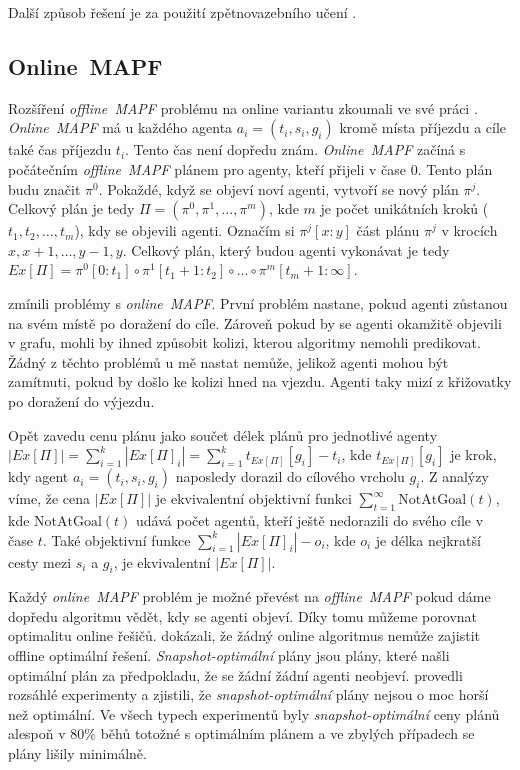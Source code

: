 Další způsob řešení je za použití zpětnovazebního učení \citep*{Zhiyao}.

\subsection{Online~MAPF}\label{subsec:online-mapf}

Rozšíření \emph{offline~MAPF} problému na online variantu zkoumali ve své práci \citet*{Svancara}.
\emph{Online~MAPF} má u každého agenta $a_i = (t_i, s_i, g_i)$ kromě místa příjezdu a cíle také čas příjezdu $t_i$.
Tento čas není dopředu znám.
\emph{Online~MAPF} začíná s počátečním \emph{offline~MAPF} plánem pro agenty, kteří přijeli v čase $0$.
Tento plán budu značit $\pi^0$.
Pokaždé, když se objeví noví agenti, vytvoří se nový plán $\pi^j$.
Celkový plán je tedy $\Pi = (\pi^0, \pi^1, \dots, \pi^m)$, kde $m$ je počet unikátních kroků ($t_1, t_2, \dots, t_m$), kdy se objevili agenti.
Označím si $\pi^j[x:y]$ část plánu $\pi^j$ v krocích $x, x + 1, \dots, y - 1, y$.
Celkový plán, který budou agenti vykonávat je tedy $Ex[\Pi] = \pi^0[0:t_1] \circ \pi^1[t_1 + 1:t_2] \circ \dots \circ \pi^m[t_m + 1:\infty]$.

\citet{Svancara} zmínili problémy s \emph{online~MAPF}.
První problém nastane, pokud agenti zůstanou na svém místě po doražení do cíle.
Zároveň pokud by se agenti okamžitě objevili v grafu, mohli by ihned způsobit kolizi, kterou algoritmy nemohli predikovat.
Žádný z těchto problémů u mě nastat nemůže, jelikož agenti mohou být zamítnuti, pokud by došlo ke kolizi hned na vjezdu.
Agenti taky mizí z křižovatky po doražení do výjezdu.

Opět zavedu cenu plánu jako součet délek plánů pro jednotlivé agenty $|Ex[\Pi]| = \sum_{i=1}^{k} |Ex[\Pi]_i| = \sum_{i=1}^{k} t_{Ex[\Pi]}[g_i] - t_i$,
kde $t_{Ex[\Pi]}[g_i]$ je krok, kdy agent $a_i = (t_i, s_i, g_i)$ naposledy dorazil do cílového vrcholu $g_i$.
Z analýzy \citet{Svancara} víme, že cena $|Ex[\Pi]|$ je ekvivalentní objektivní funkci $\sum_{t=1}^{\infty} \textrm{NotAtGoal}(t)$,
kde $\textrm{NotAtGoal}(t)$ udává počet agentů, kteří ještě nedorazili do svého cíle v čase $t$.
Také objektivní funkce $\sum_{i=1}^{k} |Ex[\Pi]_i| - o_i$, kde $o_i$ je délka nejkratší cesty mezi $s_i$ a $g_i$,
je ekvivalentní $|Ex[\Pi]|$.

Každý \emph{online~MAPF} problém je možné převést na \emph{offline~MAPF} pokud dáme dopředu algoritmu vědět, kdy se agenti objeví.
Díky tomu můžeme porovnat optimalitu online řešičů.
\citet{Svancara} dokázali, že žádný online algoritmus nemůže zajistit offline optimální řešení.
\emph{Snapshot-optimální} plány jsou plány, které našli optimální plán za předpokladu, že se  žádní žádní agenti neobjeví.
\citet*{Morag} provedli rozsáhlé experimenty a zjistili, že \emph{snapshot-optimální} plány nejsou o moc horší než optimální.
Ve všech typech experimentů byly \emph{snapshot-optimální} ceny plánů alespoň v $80\%$ běhů totožné s optimálním plánem
a ve zbylých případech se plány lišily minimálně.

